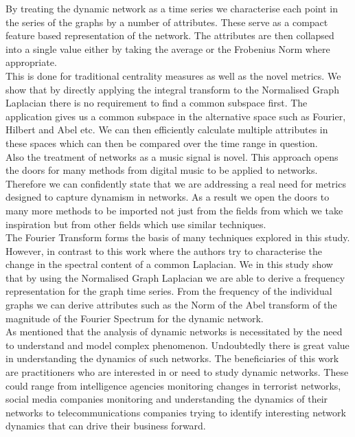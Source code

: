 By treating the dynamic network as a time series we characterise each point in the series of the graphs by a number of attributes. These serve as a compact feature based representation of the network. The attributes are then collapsed into a single value either by taking the average or the Frobenius Norm where appropriate. \\

This is done for traditional centrality measures as well as the novel metrics. We show that by directly applying the integral transform to the Normalised Graph Laplacian there is no requirement to find a common subspace first. The application gives us a common subspace in the alternative space such as Fourier, Hilbert and Abel etc. We can then efficiently calculate multiple attributes in these spaces which can then be compared over the time range in question. \\

Also the treatment of networks as a music signal is novel. This approach opens the doors for many methods from digital music to be applied to networks. Therefore we can confidently state that we are addressing a real need for metrics designed to capture dynamism in networks. As a result we open the doors to many more methods to be imported not just from the fields from which we take inspiration but from other fields which use similar techniques. \\

The Fourier Transform forms the basis of many techniques explored in this study. However, in contrast to this work where the authors try to characterise the change in the spectral content of a common Laplacian. We in this study show that by using the Normalised Graph Laplacian we are able to derive a frequency representation for the graph time series. From the frequency of the individual graphs we can derive attributes such as the Norm of the Abel transform of the magnitude of the Fourier Spectrum for the dynamic network. \\

As mentioned that the analysis of dynamic networks is necessitated by the need to understand and model complex phenomenon. Undoubtedly there is great value in understanding the dynamics of such networks. The beneficiaries of this work are practitioners who are interested in or need to study dynamic networks. These could range from intelligence agencies monitoring changes in terrorist networks, social media companies monitoring and understanding the dynamics of their networks to telecommunications companies trying to identify interesting network dynamics that can drive their business forward. \\

